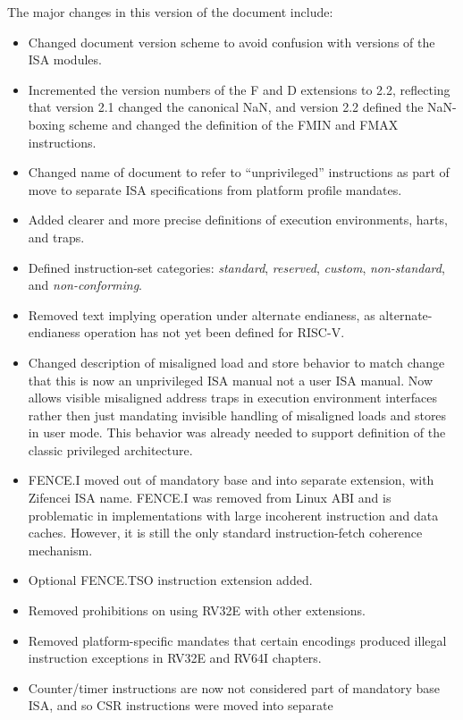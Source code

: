 The major changes in this version of the document include:
\begin{itemize}
\parskip 0pt
\itemsep 1pt
\item Changed document version scheme to avoid confusion with versions
  of the ISA modules.
\item Incremented the version numbers of the F and D extensions to 2.2,
  reflecting that version 2.1 changed the canonical NaN, and version
  2.2 defined the NaN-boxing scheme and changed the definition of the
  FMIN and FMAX instructions.
\item Changed name of document to refer to ``unprivileged''
  instructions as part of move to separate ISA specifications from
  platform profile mandates.
\item Added clearer and more precise definitions of execution
  environments, harts, and traps.
\item Defined instruction-set categories: {\em standard}, {\em
  reserved}, {\em custom}, {\em non-standard}, and {\em
  non-conforming}.
\item Removed text implying operation under alternate endianess, as
  alternate-endianess operation has not yet been defined for RISC-V.
\item Changed description of misaligned load and store behavior to
  match change that this is now an unprivileged ISA manual not a user
  ISA manual.  Now allows visible misaligned address traps in
  execution environment interfaces rather then just mandating
  invisible handling of misaligned loads and stores in user mode.
  This behavior was already needed to support definition of the
  classic privileged architecture.
\item FENCE.I moved out of mandatory base and into separate extension,
  with Zifencei ISA name.  FENCE.I was removed from Linux ABI and is
  problematic in implementations with large incoherent instruction and
  data caches.  However, it is still the only standard
  instruction-fetch coherence mechanism.
\item Optional FENCE.TSO instruction extension added.
\item Removed prohibitions on using RV32E with other extensions.
\item Removed platform-specific mandates that certain encodings
  produced illegal instruction exceptions in RV32E and RV64I chapters.
\item Counter/timer instructions are now not considered part of
  mandatory base ISA, and so CSR instructions were moved into separate

\end{itemize}
